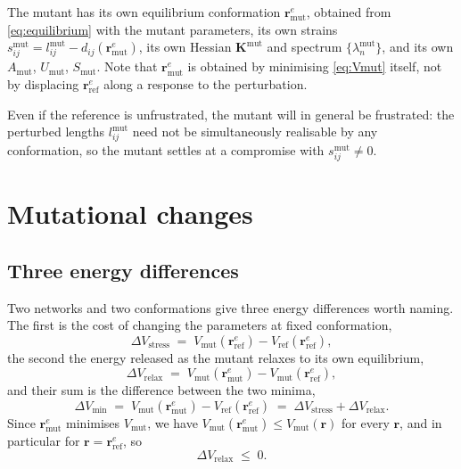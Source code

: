 \documentclass[11pt]{article}
\newcommand{\rr}{\mathbf{r}}
\newcommand{\KK}{\mathbf{K}}
\newcommand{\re}{\rr^{e}}
\providecommand{\DIFaddtex}[1]{{\protect\color{blue}\uwave{#1}}} %
\providecommand{\DIFdeltex}[1]{{\protect\color{red}\sout{#1}}}                      %
\providecommand{\DIFaddbegin}{} %
\providecommand{\DIFaddend}{} %
\providecommand{\DIFdelbegin}{} %
\providecommand{\DIFdelend}{} %
\providecommand{\DIFadd}[1]{\texorpdfstring{\DIFaddtex{#1}}{#1}} %
\providecommand{\DIFdel}[1]{\texorpdfstring{\DIFdeltex{#1}}{}} %
\begin{document}
\DIFaddend The mutant has its own equilibrium conformation $\re_{\text{mut}}$, obtained from
\eqref{eq:equilibrium} with the mutant parameters, its own strains
\DIFdelbegin \DIFdel{$s^{\text{mut}}_{ij} = l^{\text{mut}}_{ij} - d_{ij}(\re_{\text{mut}})$}\DIFdelend \DIFaddbegin \DIFadd{$s^{\text{mut}}_{ij} = d_{ij}(\re_{\text{mut}}) - l^{\text{mut}}_{ij}$}\DIFaddend , its own
Hessian $\KK^{\text{mut}}$ and spectrum $\{\lambda^{\text{mut}}_n\}$, and its own
$A_{\text{mut}}$, $U_{\text{mut}}$, $S_{\text{mut}}$. Note that $\re_{\text{mut}}$
is obtained by minimising \eqref{eq:Vmut} itself, not by displacing
$\re_{\text{ref}}$ along a response to the perturbation.

Even if the reference is unfrustrated, the mutant will in general be frustrated:
the perturbed lengths $l^{\text{mut}}_{ij}$ need not be simultaneously realisable
by any conformation, so the mutant settles at a compromise with $s^{\text{mut}}_{ij}
\ne 0$.

\section{Mutational changes}
\label{sec:changes}

\subsection{Three energy differences}

Two networks and two conformations give three energy differences worth naming. The
first is the cost of changing the parameters at fixed conformation,
\begin{equation}
\Delta V_{\text{stress}} \;=\;
V_{\text{mut}}(\re_{\text{ref}}) - V_{\text{ref}}(\re_{\text{ref}}),
\label{eq:dvstress}
\end{equation}
the second the energy released as the mutant relaxes to its own equilibrium,
\begin{equation}
\Delta V_{\text{relax}} \;=\;
V_{\text{mut}}(\re_{\text{mut}}) - V_{\text{mut}}(\re_{\text{ref}}),
\label{eq:dvrelax}
\end{equation}
and their sum is the difference between the two minima,
\begin{equation}
\Delta V_{\min} \;=\;
V_{\text{mut}}(\re_{\text{mut}}) - V_{\text{ref}}(\re_{\text{ref}})
\;=\; \Delta V_{\text{stress}} + \Delta V_{\text{relax}}.
\label{eq:dvmin}
\end{equation}
Since $\re_{\text{mut}}$ minimises $V_{\text{mut}}$, we have
$V_{\text{mut}}(\re_{\text{mut}}) \le V_{\text{mut}}(\rr)$ for every $\rr$, and in
particular for $\rr = \re_{\text{ref}}$, so
\begin{equation}
\Delta V_{\text{relax}} \;\le\; 0 .
\end{equation}
\end{document}
